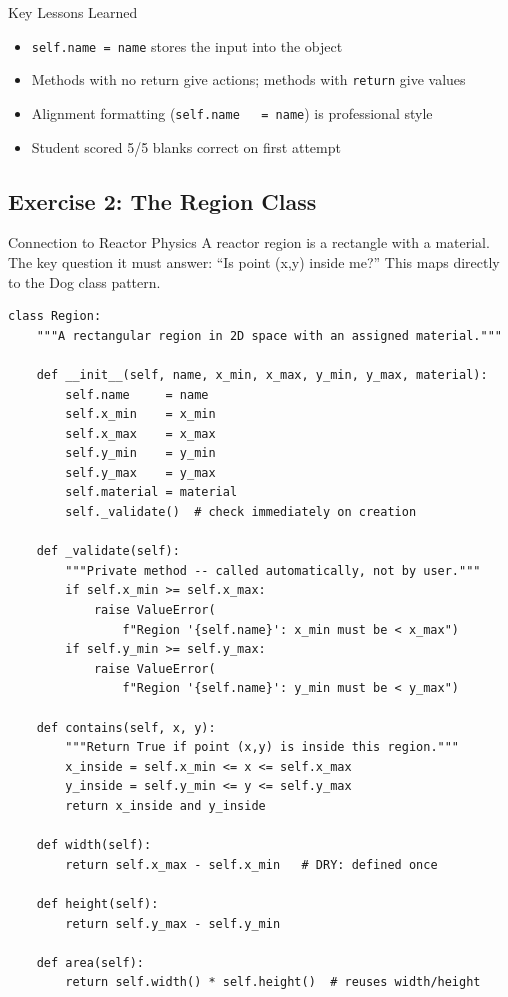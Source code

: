 \documentclass[12pt,a4paper]{article}
\begin{document}
\begin{keybox}{Key Lessons Learned}
\begin{itemize}
  \item \texttt{self.name = name} stores the input into the object
  \item Methods with no return give actions; methods with \texttt{return} give values
  \item Alignment formatting (\texttt{self.name\ \ \ = name}) is professional style
  \item Student scored 5/5 blanks correct on first attempt
\end{itemize}
\end{keybox}

\subsection{Exercise 2: The Region Class}

\begin{physicsbox}{Connection to Reactor Physics}
A reactor region is a rectangle with a material. The key question it must
answer: ``Is point (x,y) inside me?'' This maps directly to the Dog class pattern.
\end{physicsbox}

\begin{lstlisting}[caption={Region Class -- Applied to Reactor Geometry}]
class Region:
    """A rectangular region in 2D space with an assigned material."""

    def __init__(self, name, x_min, x_max, y_min, y_max, material):
        self.name     = name
        self.x_min    = x_min
        self.x_max    = x_max
        self.y_min    = y_min
        self.y_max    = y_max
        self.material = material
        self._validate()  # check immediately on creation

    def _validate(self):
        """Private method -- called automatically, not by user."""
        if self.x_min >= self.x_max:
            raise ValueError(
                f"Region '{self.name}': x_min must be < x_max")
        if self.y_min >= self.y_max:
            raise ValueError(
                f"Region '{self.name}': y_min must be < y_max")

    def contains(self, x, y):
        """Return True if point (x,y) is inside this region."""
        x_inside = self.x_min <= x <= self.x_max
        y_inside = self.y_min <= y <= self.y_max
        return x_inside and y_inside

    def width(self):
        return self.x_max - self.x_min   # DRY: defined once

    def height(self):
        return self.y_max - self.y_min

    def area(self):
        return self.width() * self.height()  # reuses width/height
\end{lstlisting}
\end{document}

